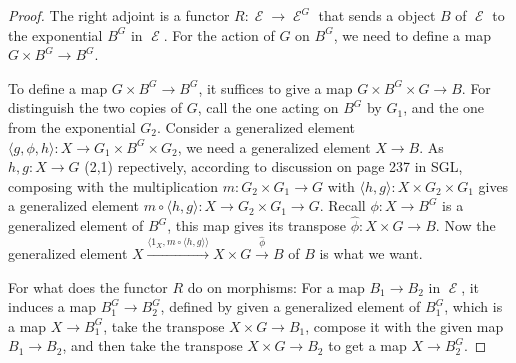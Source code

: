 \documentclass[a4paper]{article}
\DeclareMathOperator{\E}{\mathcal E}
\DeclareMathOperator{\ev}{\text {ev}}
\begin{document}
\begin{proof}
    The right adjoint is a functor $R:\E\to \E^G$ that sends a object $B$ of $\E$ to the exponential $B^G$ in $\E$. For the action of $G$ on $B^G$, we need to define a map $G\times B^G\to B^G$. 
    
    

    To define a map $G\times B^G\to B^G$, it suffices to give a map $G\times B^G\times G\to B$. For distinguish the two copies of $G$, call the one acting on $B^G$ by $G_1$, and the one from the exponential $G_2$. Consider a generalized element $\langle g,\phi,h\rangle:X\to G_1\times B^G\times G_2$, we need a generalized element $X\to B$. As $h,g:X\to G$ (2,1) repectively, according to discussion on page 237 in SGL, composing with the multiplication $m:G_2\times G_1\to G$ with $\langle h,g\rangle: X\times G_2\times G_1$ gives a generalized element $m\circ \langle h,g\rangle :X\to G_2\times G_1\to G$. Recall $\phi:X\to B^G$ is a generalized element of $B^G$, this map gives its transpose $\hat{\phi}:X\times G\to B$. Now the generalized element $X\overset{\langle 1_X,m\circ \langle h,g\rangle\rangle}\to X\times G\overset{\hat{\phi}} \to B$ of $B$ is what we want. 
    
    
    
    
    
    
    For what does the functor $R$ do on morphisms: For a map $B_1\to B_2$ in $\E$, it induces a map $B_1^G\to B_2^G$, defined by given a generalized element of $B_1^G$, which is a map $X\to B_1^G$, take the transpose $X\times G\to B_1$, compose it with the given map $B_1\to B_2$, and then take the transpose $X\times G\to B_2$ to get a map $X\to B_2^G$.


\end{proof}
\end{document}
